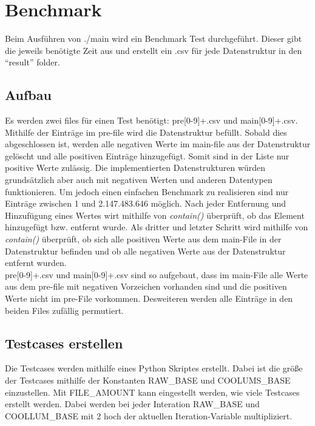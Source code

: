 \section{Benchmark}
Beim Ausführen von ./main wird ein Benchmark Test durchgeführt. Dieser gibt die jeweils benötigte Zeit aus und erstellt ein .csv für jede Datenstruktur
in den ``result'' folder. 

\subsection{Aufbau}
\label{bench:aufbau}
Es werden zwei files für einen Test benötigt: pre[0-9]+.csv und main[0-9]+.csv. Mithilfe der Einträge im pre-file wird die
Datenstruktur befüllt. Sobald dies abgeschlossen ist, werden alle negativen Werte im main-file aus der Datenstruktur gelöscht 
und alle positiven Einträge hinzugefügt. Somit sind in der Liste nur positive Werte zulässig. Die implementierten Datenstrukturen
würden grundsätzlich aber auch mit negativen Werten und anderen Datentypen funktionieren. Um jedoch einen einfachen 
Benchmark zu realisieren sind nur Einträge zwischen 1 und 2.147.483.646 möglich. 
Nach jeder Entfernung und Hinzufügung eines Wertes wirt mithilfe von \textit{contain()} überprüft, ob das Element hinzugefügt bzw.
entfernt wurde. 
Als dritter und letzter Schritt wird mithilfe von \textit{contain()} überprüft, ob sich alle positiven Werte aus dem main-File 
in der Datenstruktur befinden und ob alle negativen Werte aus der Datenstruktur entfernt wurden. 
\\
pre[0-9]+.csv und main[0-9]+.csv sind so aufgebaut, dass im main-File alle Werte aus dem pre-file mit negativen Vorzeichen
vorhanden sind und die positiven Werte nicht im pre-File vorkommen. Desweiteren werden alle Einträge in den beiden Files
zufällig permutiert. 

\subsection{Testcases erstellen}
Die Testcases werden mithilfe eines Python Skriptes erstellt. Dabei ist die größe der Testcases mithilfe der Konstanten
RAW\_BASE und COOLUMS\_BASE einzustellen. Mit FILE\_AMOUNT kann eingestellt werden, wie viele Testcases erstellt werden.
Dabei werden bei jeder Interation RAW\_BASE und COOLLUM\_BASE mit 2 hoch der aktuellen Iteration-Variable multipliziert. 


